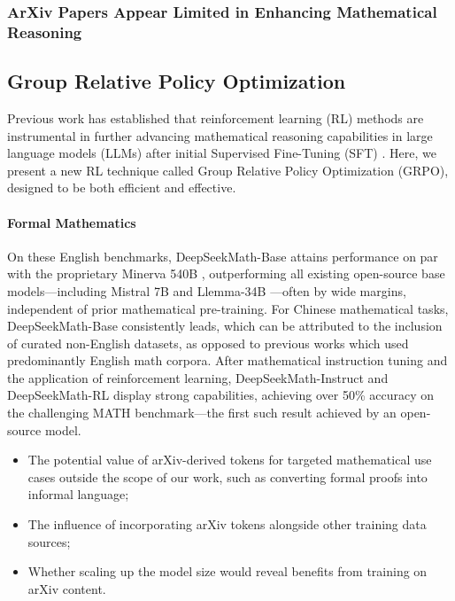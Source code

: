 \subsubsection{ArXiv Papers Appear Limited in Enhancing Mathematical Reasoning}

\subsection{Group Relative Policy Optimization} Previous work has established that reinforcement learning (RL) methods are instrumental in further advancing mathematical reasoning capabilities in large language models (LLMs) after initial Supervised Fine-Tuning (SFT) \citep{wang2023math,wizardmath}. Here, we present a new RL technique called Group Relative Policy Optimization (GRPO), designed to be both efficient and effective.

\paragraph{Formal Mathematics}

    On these English benchmarks, DeepSeekMath-Base attains performance on par with the proprietary Minerva 540B \citep{minerva}, outperforming all existing open-source base models—including Mistral 7B \citep{mistral} and Llemma-34B \citep{llemma}—often by wide margins, independent of prior mathematical pre-training. For Chinese mathematical tasks, DeepSeekMath-Base consistently leads, which can be attributed to the inclusion of curated non-English datasets, as opposed to previous works \citep{minerva,llemma} which used predominantly English math corpora. After mathematical instruction tuning and the application of reinforcement learning, DeepSeekMath-Instruct and DeepSeekMath-RL display strong capabilities, achieving over 50\% accuracy on the challenging MATH benchmark—the first such result achieved by an open-source model.

\begin{itemize}[topsep=0pt]
    \item The potential value of arXiv-derived tokens for targeted mathematical use cases outside the scope of our work, such as converting formal proofs into informal language;
    \item The influence of incorporating arXiv tokens alongside other training data sources;
    \item Whether scaling up the model size would reveal benefits from training on arXiv content.
\end{itemize}

